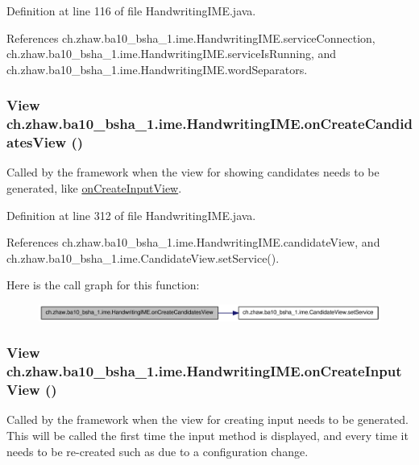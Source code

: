 Definition at line 116 of file HandwritingIME.java.

References ch.zhaw.ba10\_\-bsha\_\-1.ime.HandwritingIME.serviceConnection, ch.zhaw.ba10\_\-bsha\_\-1.ime.HandwritingIME.serviceIsRunning, and ch.zhaw.ba10\_\-bsha\_\-1.ime.HandwritingIME.wordSeparators.\hypertarget{classch_1_1zhaw_1_1ba10__bsha__1_1_1ime_1_1HandwritingIME_a478af9d9f8258613e4e124bdfdd8dc09}{
\subsubsection[{onCreateCandidatesView}]{\setlength{\rightskip}{0pt plus 5cm}View ch.zhaw.ba10\_\-bsha\_\-1.ime.HandwritingIME.onCreateCandidatesView ()}}
\label{classch_1_1zhaw_1_1ba10__bsha__1_1_1ime_1_1HandwritingIME_a478af9d9f8258613e4e124bdfdd8dc09}
Called by the framework when the view for showing candidates needs to be generated, like \hyperlink{classch_1_1zhaw_1_1ba10__bsha__1_1_1ime_1_1HandwritingIME_a920e8e85634fc64519604846302aaa58}{onCreateInputView}. 

Definition at line 312 of file HandwritingIME.java.

References ch.zhaw.ba10\_\-bsha\_\-1.ime.HandwritingIME.candidateView, and ch.zhaw.ba10\_\-bsha\_\-1.ime.CandidateView.setService().

Here is the call graph for this function:\nopagebreak
\begin{figure}[H]
\begin{center}
\leavevmode
\includegraphics[width=323pt]{classch_1_1zhaw_1_1ba10__bsha__1_1_1ime_1_1HandwritingIME_a478af9d9f8258613e4e124bdfdd8dc09_cgraph}
\end{center}
\end{figure}
\hypertarget{classch_1_1zhaw_1_1ba10__bsha__1_1_1ime_1_1HandwritingIME_a920e8e85634fc64519604846302aaa58}{
\subsubsection[{onCreateInputView}]{\setlength{\rightskip}{0pt plus 5cm}View ch.zhaw.ba10\_\-bsha\_\-1.ime.HandwritingIME.onCreateInputView ()}}
\label{classch_1_1zhaw_1_1ba10__bsha__1_1_1ime_1_1HandwritingIME_a920e8e85634fc64519604846302aaa58}
Called by the framework when the view for creating input needs to be generated. This will be called the first time the input method is displayed, and every time it needs to be re-\/created such as due to a configuration change. 

